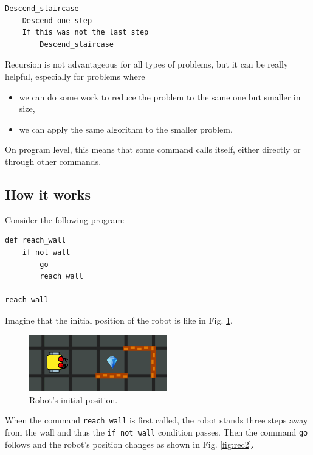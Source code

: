 {{{{\begin{verbatim}
Descend_staircase
    Descend one step
    If this was not the last step
        Descend_staircase
\end{verbatim}
Recursion is not advantageous for all types of problems, but it can be really 
helpful, especially for problems where 
\begin{itemize}
\item we can do some work to reduce the problem to the same one but smaller in size, 
\item we can apply the same algorithm to the smaller problem. 
\end{itemize}
On program level, this means that some command calls itself, either 
directly or through other commands.

\subsection{How it works} 

Consider the following program:
\begin{verbatim}
def reach_wall
    if not wall
        go
        reach_wall

reach_wall
\end{verbatim}
Imagine that the initial position of the robot is like in Fig. \ref{fig:rec1}.


\begin{figure}[!ht]
\begin{center}
\includegraphics[width=6cm]{imgk/rec-1.png}
\end{center}
\vspace{-4mm}
\caption{Robot's initial position.}
\label{fig:rec1}
\vspace{-4mm}
\end{figure}
\noindent
When the command {\tt reach\_wall} is first called, the robot stands three steps away from the wall and 
thus the {\tt if not wall} condition passes. Then the command {\tt go} follows and the robot's 
position changes as shown in Fig. \ref{fig:rec2}. 

}}}}
